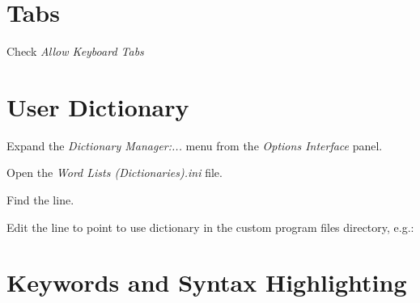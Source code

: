 \section{Tabs}
   \begin{numberedlist}
   	\item {}
   	\item Check \textit{Allow Keyboard Tabs}
   \end{numberedlist}

\section{User Dictionary}
\begin{numberedlist}
	\item Expand the \textit{Dictionary Manager:...} menu from the \textit{Options Interface} panel.
	\item Open the \textit{Word Lists (Dictionaries).ini} file.
	\item Find the  line.
	\item Edit the  line to point to use dictionary in the custom program files directory, e.g.:
	\begin{plainlist}
		\item {}
	\end{plainlist}
\end{numberedlist}

\section{Keywords and Syntax Highlighting}
